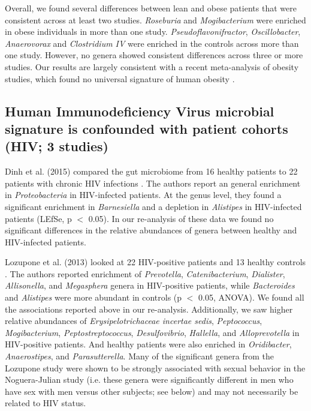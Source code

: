 \documentclass{article}
\begin{document}
{Overall, we found several differences between lean and obese patients that were consistent across at least two studies. 
\textit{Roseburia} and \textit{Mogibacterium} were enriched in obese individuals in more than one study. \textit{Pseudoflavonifractor}, \textit{Oscillobacter}, \textit{Anaerovorax} and \textit{Clostridium IV} were enriched in the controls across more than one study. However, no genera showed consistent differences across three or more studies.
Our results are largely consistent with a recent meta-analysis of obesity studies, which found no universal signature of human obesity \cite{Sze07092016}.

\subsection*{Human Immunodeficiency Virus microbial signature is confounded with patient cohorts (HIV; 3 studies)}

Dinh et al. (2015) compared the gut microbiome from 16 healthy patients to 22 patients with chronic HIV infections \cite{hiv-dinh}. 
The authors report an general enrichment in \textit{Proteobacteria} in HIV-infected patients. 
At the genus level, they found a significant enrichment in \textit{Barnesiella} and a depletion in \textit{Alistipes} in HIV-infected patients (LEfSe, p $<$ 0.05). 
In our re-analysis of these data we found no significant differences in the relative abundances of genera between healthy and HIV-infected patients.

Lozupone et al. (2013) looked at 22 HIV-positive patients and 13 healthy controls \cite{lozupone2013alterations}. 
The authors reported enrichment of \textit{Prevotella}, \textit{Catenibacterium}, \textit{Dialister}, \textit{Allisonella}, and \textit{Megasphera} genera in HIV-positive patients, while \textit{Bacteroides} and \textit{Alistipes} were more abundant in controls (p $<$ 0.05, ANOVA). 
We found all the associations reported above in our re-analysis. 
Additionally, we saw higher relative abundances of \textit{Erysipelotrichaceae incertae sedis}, \textit{Peptococcus}, \textit{Mogibacterium}, \textit{Peptostreptococcus}, \textit{Desulfovibrio}, \textit{Hallella}, and \textit{Alloprevotella} in HIV-positive patients. 
And healthy patients were also enriched in \textit{Oridibacter}, \textit{Anaerostipes}, and \textit{Parasutterella}. 
Many of the significant genera from the Lozupone study were shown to be strongly associated with sexual behavior in the Noguera-Julian study (i.e. these genera were significantly different in men who have sex with men versus other subjects; see below) and may not necessarily be related to HIV status.

}
\end{document}

